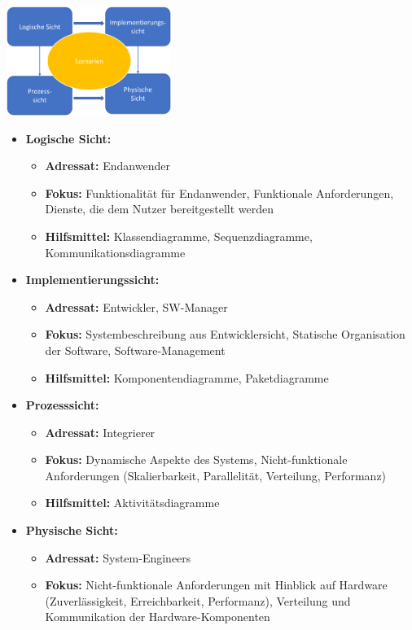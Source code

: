 \documentclass[11pt, a4paper]{article}
\begin{document}
\centering \includegraphics[width=0.4\textwidth]{Kruchten-00.png}

\begin{itemize}
    \item \textbf{Logische Sicht:}
    \begin{itemize}
        \item \textbf{Adressat:} Endanwender
        \item \textbf{Fokus:} Funktionalität für Endanwender, Funktionale Anforderungen, Dienste, die dem Nutzer bereitgestellt werden
        \item \textbf{Hilfsmittel:} Klassendiagramme, Sequenzdiagramme, Kommunikationsdiagramme
    \end{itemize}
    \item \textbf{Implementierungssicht:}
    \begin{itemize}
        \item \textbf{Adressat:} Entwickler, SW-Manager
        \item \textbf{Fokus:} Systembeschreibung aus Entwicklersicht, Statische Organisation der Software, Software-Management
        \item \textbf{Hilfsmittel:} Komponentendiagramme, Paketdiagramme
    \end{itemize}
    \item \textbf{Prozesssicht:}
    \begin{itemize}
        \item \textbf{Adressat:} Integrierer
        \item \textbf{Fokus:} Dynamische Aspekte des Systems, Nicht-funktionale Anforderungen (Skalierbarkeit, Parallelität, Verteilung, Performanz)
        \item \textbf{Hilfsmittel:} Aktivitätsdiagramme
    \end{itemize}
    \item \textbf{Physische Sicht:}
    \begin{itemize}
        \item \textbf{Adressat:} System-Engineers
        \item \textbf{Fokus:} Nicht-funktionale Anforderungen mit Hinblick auf Hardware (Zuverlässigkeit, Erreichbarkeit, Performanz), Verteilung und Kommunikation der Hardware-Komponenten

\end{itemize}
\end{itemize}
\end{document}
